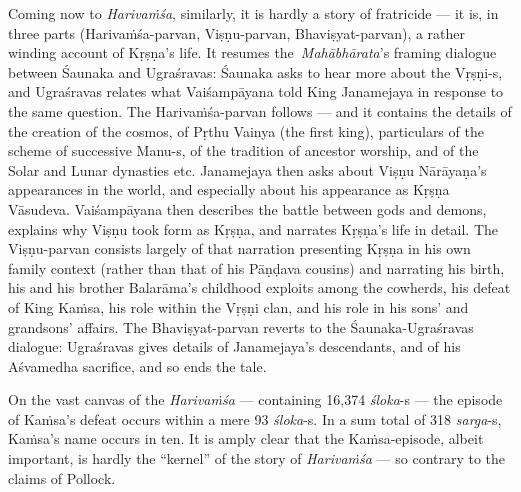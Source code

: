 Coming now to {\sl Harivaṁśa}, similarly, it is hardly a story of fratricide --- it is, in three parts (Harivaṁśa-parvan, Viṣṇu-parvan, Bhaviṣyat-parvan), a rather winding account of Kṛṣṇa’s life. It resumes the {\sl Mahābhārata}’s framing dialogue between Śaunaka and Ugraśravas: Śaunaka asks to hear more about the Vṛṣṇi-s, and Ugraśravas relates what Vaiśampāyana told King Janamejaya in response to the same question. The Harivaṁśa-parvan follows --- and it contains the details of the creation of the cosmos, of Pṛthu Vainya (the first king), particulars of the scheme of successive Manu-s, of the tradition of ancestor worship, and of the Solar and Lunar dynasties etc. Janamejaya then asks about Viṣṇu Nārāyaṇa’s appearances in the world, and especially about his appearance as Kṛṣṇa Vāsudeva. Vaiśampāyana then describes the battle between gods and demons, explains why Viṣṇu took form as Kṛṣṇa, and narrates Kṛṣṇa’s life in detail. The Viṣṇu-parvan consists largely of that narration presenting Kṛṣṇa in his own family context (rather than that of his Pāṇḍava cousins) and narrating his birth, his and his brother Balarāma’s childhood exploits among the cowherds, his defeat of King Kaṁsa, his role within the Vṛṣṇi clan, and his role in his sons’ and grandsons’ affairs. The Bhaviṣyat-parvan reverts to the Śaunaka-Ugraśravas dialogue: Ugraśravas gives details of Janamejaya’s descendants, and of his Aśvamedha sacrifice, and so ends the tale.

On the vast canvas of the {\sl Harivaṁśa} --- containing 16,374 {\sl śloka}-s --- the episode of Kaṁsa’s defeat occurs within a mere 93 {\sl śloka}-s. In a sum total of 318 {\sl sarga}-s, Kaṁsa’s name occurs in ten. It is amply clear that the Kaṁsa-episode, albeit important, is hardly the “kernel” of the story of {\sl Harivaṁśa} --- so contrary to the claims of Pollock. 

